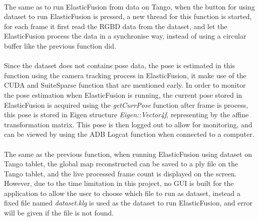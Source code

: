 \documentclass[12pt,twoside]{article}
\begin{document}
\\
The same as to run ElasticFusion from data on Tango, when the button for using dataset to run ElasticFusion is pressed, a new thread for this function is started, for each frame it first read the RGBD data from the dataset, and let the ElasticFusion process the data in a synchronise way, instead of using a circular buffer like the previous function did.\\
\\
Since the dataset does not contains pose data, the pose is estimated in this function using the camera tracking process in ElasticFusion, it make use of the CUDA and SuiteSparse function that are mentioned early. In order to monitor the pose estimation when ElasticFusion is running, the current pose stored in ElasticFusion is acquired using the \textit{getCurrPose} function after frame is process, this pose is stored in Eigen structure \textit{Eigen::Vector4f}, representing by the affine transformation matrix. This pose is then logged out to allow for monitoring, and can be viewed by using the ADB Logcat function when connected to a computer.\\
\\
The same as the previous function, when running ElasticFusion using dataset on Tango tablet, the global map reconstructed can be saved to a ply file on the Tango tablet, and the live processed frame count is displayed on the screen. However, due to the time limitation in this project, no GUI is built for the application to allow the user to choose which file to run as dataset, instead a fixed file named \textit{dataset.klg} is used as the dataset to run ElasticFusion, and error will be given if the file is not found.\\
\end{document}
